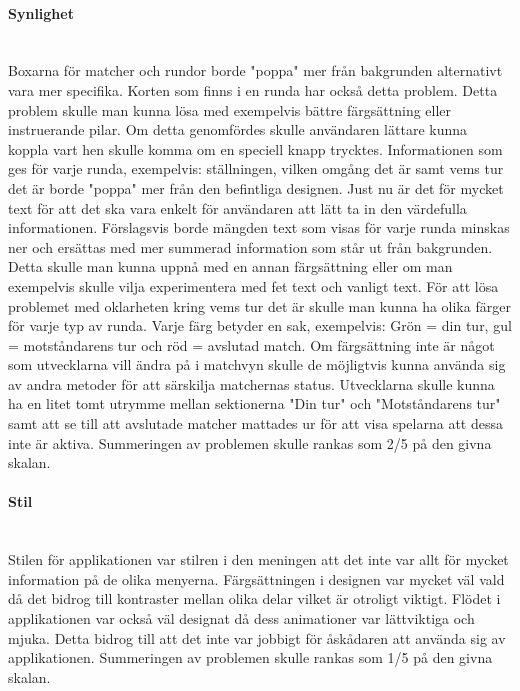 \documentclass[a4paper, 11pt]{article}
\begin{document}
\paragraph{Synlighet}\mbox{}\\
Boxarna för matcher och rundor borde "poppa" mer från bakgrunden alternativt vara mer specifika. Korten som finns i en runda har också detta problem. Detta problem skulle man kunna lösa med exempelvis bättre färgsättning eller instruerande pilar. Om detta genomfördes skulle användaren lättare kunna koppla vart hen skulle komma om en speciell knapp trycktes.
Informationen som ges för varje runda, exempelvis: ställningen, vilken omgång det är samt vems tur det är borde "poppa" mer från den befintliga designen. Just nu är det för mycket text för att det ska vara enkelt för användaren att lätt ta in den värdefulla informationen. Förslagsvis borde mängden text som visas för varje runda minskas ner och ersättas med mer summerad information som står ut från bakgrunden. Detta skulle man kunna uppnå med en annan färgsättning eller om man exempelvis skulle vilja experimentera med fet text och vanligt text. 
För att lösa problemet med oklarheten kring vems tur det är skulle man kunna ha olika färger för varje typ av runda. Varje färg betyder en sak, exempelvis: Grön = din tur, gul = motståndarens tur och röd = avslutad match. Om färgsättning inte är något som utvecklarna vill ändra på i matchvyn skulle de möjligtvis kunna använda sig av andra metoder för att särskilja matchernas status. Utvecklarna skulle kunna ha en litet tomt utrymme mellan sektionerna "Din tur" och "Motståndarens tur" samt att se till att avslutade matcher mattades ur för att visa spelarna att dessa inte är aktiva.
Summeringen av problemen skulle rankas som 2/5 på den givna skalan.    

\paragraph{Stil}\mbox{}\\
Stilen för applikationen var stilren i den meningen att det inte var allt för mycket information på de olika menyerna. Färgsättningen i designen var mycket väl vald då det bidrog till kontraster mellan olika delar vilket är otroligt viktigt. Flödet i applikationen var också väl designat då  dess animationer var lättviktiga och mjuka. Detta bidrog till att det inte var jobbigt för åskådaren att använda sig av applikationen.
Summeringen av problemen skulle rankas som 1/5 på den givna skalan.
\end{document}
